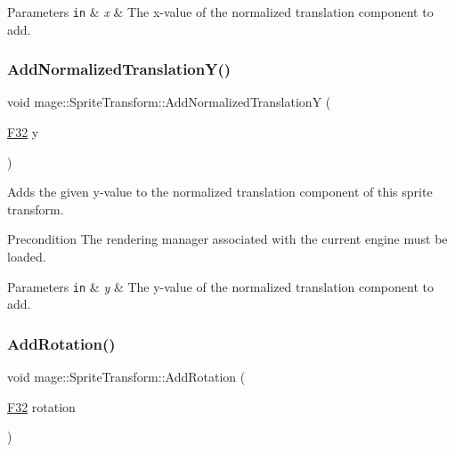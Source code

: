 \begin{DoxyParams}[1]{Parameters}
\mbox{\tt in}  & {\em x} & The x-\/value of the normalized translation component to add. \\
\hline
\end{DoxyParams}
\hypertarget{classmage_1_1_sprite_transform_aea97be812ff2a83bd255d3419354dbe3}{}\label{classmage_1_1_sprite_transform_aea97be812ff2a83bd255d3419354dbe3} 
\subsubsection{\texorpdfstring{Add\+Normalized\+Translation\+Y()}{AddNormalizedTranslationY()}}
{\footnotesize\ttfamily void mage\+::\+Sprite\+Transform\+::\+Add\+Normalized\+TranslationY (\begin{DoxyParamCaption}\item[{\hyperlink{namespacemage_aa97e833b45f06d60a0a9c4fc22ae02c0}{F32}}]{y }\end{DoxyParamCaption})}

Adds the given y-\/value to the normalized translation component of this sprite transform.

\begin{DoxyPrecond}{Precondition}
The rendering manager associated with the current engine must be loaded. 
\end{DoxyPrecond}

\begin{DoxyParams}[1]{Parameters}
\mbox{\tt in}  & {\em y} & The y-\/value of the normalized translation component to add. \\
\hline
\end{DoxyParams}
\hypertarget{classmage_1_1_sprite_transform_ab189a29372631e74ae5f638243eaa312}{}\label{classmage_1_1_sprite_transform_ab189a29372631e74ae5f638243eaa312} 
\subsubsection{\texorpdfstring{Add\+Rotation()}{AddRotation()}}
{\footnotesize\ttfamily void mage\+::\+Sprite\+Transform\+::\+Add\+Rotation (\begin{DoxyParamCaption}\item[{\hyperlink{namespacemage_aa97e833b45f06d60a0a9c4fc22ae02c0}{F32}}]{rotation }\end{DoxyParamCaption})\hspace{0.3cm}{\ttfamily [noexcept]}}

